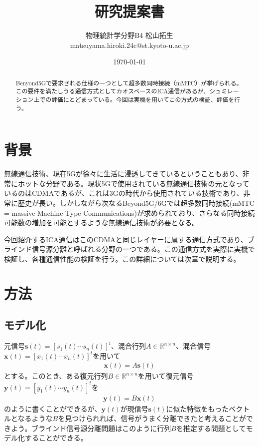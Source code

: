 \documentclass{jsarticle}
\title{研究提案書}
\author{物理統計学分野B4 松山拓生 \\ matsuyama.hiroki.24c@st.kyoto-u.ac.jp}
\date{\today}
\begin{document}
\maketitle

\begin{abstract}
Benyond5Gで要求される仕様の一つとして超多数同時接続（mMTC）が挙げられる。この要件を満たしうる通信方式としてカオスベースのICA通信があるが、シュミレーション上での評価にとどまっている。今回は実機を用いてこの方式の検証、評価を行う。
\end{abstract} 

\section{背景}
無線通信技術、現在5Gが徐々に生活に浸透してきているということもあり、非常にホットな分野である。現状5Gで使用されている無線通信技術の元となっているのはCDMA\cite{cdma-overview}であるが、これは3Gの時代から使用されている技術であり、非常に歴史が長い。しかしながら次なるBeyond5G/6Gでは超多数同時接続\cite{mmtc}(mMTC = massive Machine-Type Communications)が求められており、さらなる同時接続可能数の増加を可能とするような無線通信技術が必要となる。

今回紹介するICA通信\cite{red-book}はこのCDMAと同じレイヤーに属する通信方式であり、ブラインド信号源分離と呼ばれる分野の一つである。この通信方式を実際に実機で検証し、各種通信性能の検証を行う。この詳細については次章で説明する。

\section{方法}
\subsection{モデル化}
元信号$\textbf{s}(t) = [s_1(t) \cdots s_n(t)]^t$、混合行列$A\in \mathbb{R}^{n\times n}$、混合信号$\textbf{x}(t) = [x_1(t) \cdots x_n(t)]^t$を用いて
\begin{gather}
    \textbf{x}(t) = A\textbf{s}(t)
\end{gather}
とする。このとき、ある復元行列$B\in \mathbb{R}^{n\times n}$を用いて復元信号$\textbf{y}(t)= [y_1(t) \cdots y_n(t)]^t$を
\begin{gather}
    \textbf{y}(t) = B\textbf{x}(t)
\end{gather}
のように書くことができるが、$\textbf{y}(t)$が現信号$\textbf{s}(t)$に似た特徴をもったベクトルとなるような$B$を見つけられれば、信号がうまく分離できたと考えることができよう。ブラインド信号源分離問題はこのように行列$B$を推定する問題としてモデル化することができる。
\end{document}
